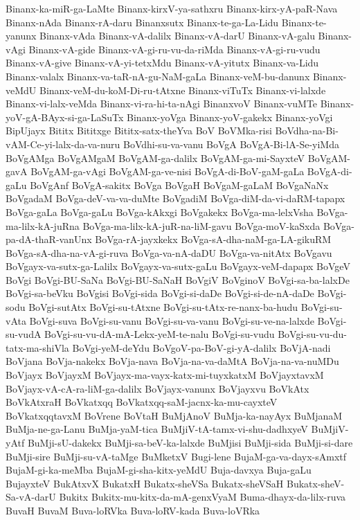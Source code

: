 {Binanx-ka-miR-ga-LaMte
Binanx-kirxV-ya-sathxru
Binanx-kirx-yA-paR-Nava
Binanx-nAda
Binanx-rA-daru
Binanxsutx
Binanx-te-ga-La-Lidu
Binanx-te-yanunx
Binanx-vAda
Binanx-vA-dalilx
Binanx-vA-darU
Binanx-vA-galu
Binanx-vAgi
Binanx-vA-gide
Binanx-vA-gi-ru-vu-da-riMda
Binanx-vA-gi-ru-vudu
Binanx-vA-give
Binanx-vA-yi-tetxMdu
Binanx-vA-yitutx
Binanx-va-Lidu
Binanx-valalx
Binanx-va-taR-nA-gu-NaM-gaLa
Binanx-veM-bu-danunx
Binanx-veMdU
Binanx-veM-du-koM-Di-ru-tAtxne
Binanx-viTuTx
Binanx-vi-lalxde
Binanx-vi-lalx-veMda
Binanx-vi-ra-hi-ta-nAgi
BinanxvoV
Binanx-vuMTe
Binanx-yoV-gA-BAyx-si-ga-LaSuTx
Binanx-yoVga
Binanx-yoV-gakekx
Binanx-yoVgi
BipUjayx
Bititx
Bititxge
Bititx-satx-theYva
BoV
BoVMka-risi
BoVdha-na-Bi-vAM-Ce-yi-lalx-da-va-nuru
BoVdhi-su-va-vanu
BoVgA
BoVgA-Bi-lA-Se-yiMda
BoVgAMga
BoVgAMgaM
BoVgAM-ga-dalilx
BoVgAM-ga-mi-SayxteV
BoVgAM-gavA
BoVgAM-ga-vAgi
BoVgAM-ga-ve-nisi
BoVgA-di-BoV-gaM-gaLa
BoVgA-di-gaLu
BoVgAnf
BoVgA-sakitx
BoVga
BoVgaH
BoVgaM-gaLaM
BoVgaNaNx
BoVgadaM
BoVga-deV-va-va-duMte
BoVgadiM
BoVga-diM-da-vi-daRM-tapapx
BoVga-gaLa
BoVga-gaLu
BoVga-kAkxgi
BoVgakekx
BoVga-ma-lelxVsha
BoVga-ma-lilx-kA-juRna
BoVga-ma-lilx-kA-juR-na-liM-gavu
BoVga-moV-kaSxda
BoVga-pa-dA-thaR-vanUnx
BoVga-rA-jayxkekx
BoVga-sA-dha-naM-ga-LA-gikuRM
BoVga-sA-dha-na-vA-gi-ruva
BoVga-va-nA-daDU
BoVga-va-nitAtx
BoVgavu
BoVgayx-va-sutx-ga-Lalilx
BoVgayx-va-sutx-gaLu
BoVgayx-veM-dapapx
BoVgeV
BoVgi
BoVgi-BU-SaNa
BoVgi-BU-SaNaH
BoVgiV
BoVginoV
BoVgi-sa-ba-lalxDe
BoVgi-sa-beVku
BoVgisi
BoVgi-sida
BoVgi-si-daDe
BoVgi-si-de-nA-daDe
BoVgi-sodu
BoVgi-sutAtx
BoVgi-su-tAtxne
BoVgi-su-tAtx-re-nanx-ba-hudu
BoVgi-su-vAta
BoVgi-suva
BoVgi-su-vanu
BoVgi-su-va-vanu
BoVgi-su-ve-na-lalxde
BoVgi-su-vudA
BoVgi-su-vu-dA-mA-Lekx-yeM-te-nalu
BoVgi-su-vudu
BoVgi-su-vu-du-tatx-ma-shiVla
BoVgi-yeM-deYdu
BoVgoV-pa-BoV-gi-yA-dalilx
BoVjA-nadi
BoVjana
BoVja-nakekx
BoVja-nava
BoVja-na-va-daMtA
BoVja-na-va-nuMDu
BoVjayx
BoVjayxM
BoVjayx-ma-vayx-katx-mi-tuyxkatxM
BoVjayxtavxM
BoVjayx-vA-cA-ra-liM-ga-dalilx
BoVjayx-vanunx
BoVjayxvu
BoVkAtx
BoVkAtxraH
BoVkatxqq
BoVkatxqq-saM-jacnx-ka-mu-cayxteV
BoVkatxqqtavxM
BoVrene
BoVtaH
BuMjAnoV
BuMja-ka-nayAyx
BuMjanaM
BuMja-ne-ga-Lanu
BuMja-yaM-tica
BuMjiV-tA-tamx-vi-shu-dadhxyeV
BuMjiV-yAtf
BuMji-sU-dakekx
BuMji-sa-beV-ka-lalxde
BuMjisi
BuMji-sida
BuMji-si-dare
BuMji-sire
BuMji-su-vA-taMge
BuMketxV
Bugi-lene
BujaM-ga-va-dayx-sAmxtf
BujaM-gi-ka-meMba
BujaM-gi-sha-kitx-yeMdU
Buja-davxya
Buja-gaLu
BujayxteV
BukAtxvX
BukatxH
Bukatx-sheVSa
Bukatx-sheVSaH
Bukatx-sheV-Sa-vA-darU
Bukitx
Bukitx-mu-kitx-da-mA-genxVyaM
Buma-dhayx-da-lilx-ruva
BuvaH
BuvaM
Buva-loRVka
Buva-loRV-kada
Buva-loVRka
}
